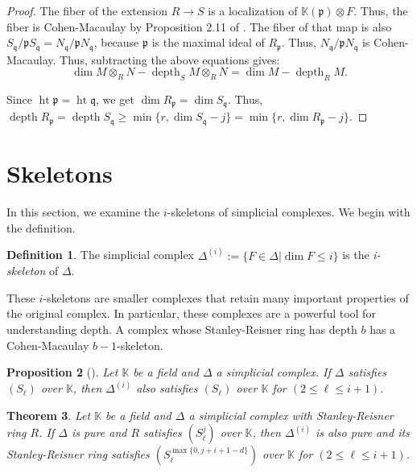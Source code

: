 \documentclass[11pt]{amsart}
\numberwithin{equation}{section}
\newtheorem{theorem}{Theorem}[section]
\newtheorem{prop}[theorem]{Proposition}
\theoremstyle{definition}
\newtheorem{defn}[theorem]{Definition}
\theoremstyle{remark}
\newcommand{\height}{\operatorname{ht}}
\newcommand{\depth}{\operatorname{depth}}
\begin{document}
\begin{proof}
The fiber of the extension $R \rightarrow S$ is a localization of $\mathbb{K}(\mathfrak{p}) \otimes F$.  Thus, the fiber is Cohen-Macaulay by Proposition 2.11 of \cite{BH98}.  The fiber of that map is also $S_\mathfrak{q}/\mathfrak{p}S_\mathfrak{q} = N_\mathfrak{q}/\mathfrak{p}N_\mathfrak{q}$, because $\mathfrak{p}$ is the maximal ideal of $R_\mathfrak{p}$.  Thus, $N_\mathfrak{q}/\mathfrak{p}N_\mathfrak{q}$ is Cohen-Macaulay.  Thus, subtracting the above equations gives:
\[ \dim M \otimes_R N - \depth_S M \otimes_R N = \dim M - \depth_R M. \]

Since $\height \mathfrak{p} = \height \mathfrak{q}$, we get $\dim R_\mathfrak{p} = \dim S_\mathfrak{q}$.  Thus, $\depth R_\mathfrak{p} = \depth S_\mathfrak{q} \geq \min \{ r, \dim S_\mathfrak{q}-j\} = \min \{ r, \dim R_\mathfrak{p}-j\}$.

\end{proof}

\section{Skeletons}
In this section, we examine the $i$-skeletons of simplicial complexes.  We begin with the definition.

\begin{defn}
The simplicial complex $\Delta ^{(i)} := \{ F \in \Delta | \dim F \leq  i \}$ is the \textit{i-skeleton} of $\Delta$.
\end{defn}

These $i$-skeletons are smaller complexes that retain many important properties of the original complex.  In particular, these complexes are a powerful tool for understanding depth.  A complex whose Stanley-Reisner ring has depth $b$ has a Cohen-Macaulay $b-1$-skeleton.

\begin{prop}[{\cite[Proposition $2.3$]{HT11}}]
Let $\mathbb{K}$ be a field and $\Delta$ a simplicial complex.  If $\Delta$ satisfies $(S_\ell)$ over $\mathbb{K}$, then $\Delta ^{(i)}$ also satisfies $(S_\ell)$ over $\mathbb{K}$ for $(2  \leq \ell \leq i+1)$.  
\end{prop}

\begin{theorem}
Let $\mathbb{K}$ be a field and $\Delta$ a simplicial complex with Stanley-Reisner ring $R$.  If $\Delta$ is pure and $R$ satisfies $(S_\ell^j)$ over $\mathbb{K}$, then $\Delta ^{(i)}$ is also pure and its Stanley-Reisner ring satisfies $(S_\ell^{\max \{ 0, j+i+1-d\}})$ over $\mathbb{K}$ for $(2  \leq \ell \leq i+1)$.  
\end{theorem}
\end{document}
